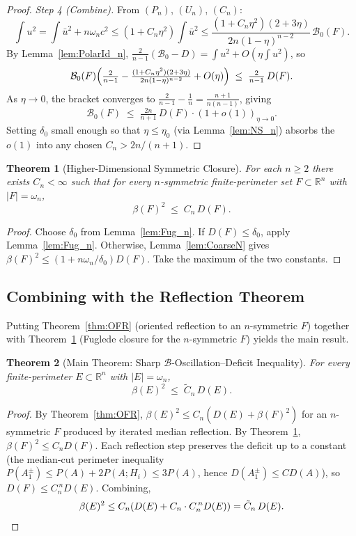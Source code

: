 \documentclass[11pt]{article}
\newtheorem{theorem}{Theorem}[section]
\newcommand{\R}{\mathbb{R}}
\newcommand{\B}{\mathcal{B}}
\begin{document}
\begin{proof}
\smallskip
\emph{Step 4 (Combine).} From $(P_n)$, $(U_n)$, $(C_n)$:
\[
   \int u^2 = \int\bar u^2 + n\omega_n c^2 \le (1 + C_n\eta^2)\!\int\bar u^2 \le \frac{(1 + C_n\eta^2)(2+3\eta)}{2n(1-\eta)^{n-2}}\,\B_0(F).
\]
By Lemma~\ref{lem:PolarId_n}, $\tfrac{2}{n-1}(\B_0 - D) = \int u^2 + O(\eta\int u^2)$, so
\[
   \B_0(F)\Bigl(\tfrac{2}{n-1} - \tfrac{(1 + C_n\eta^2)(2+3\eta)}{2n(1-\eta)^{n-2}} + O(\eta)\Bigr) \;\le\; \tfrac{2}{n-1}\,D(F).
\]
As $\eta\to 0$, the bracket converges to $\tfrac{2}{n-1} - \tfrac{1}{n} = \tfrac{n+1}{n(n-1)}$, giving
\[
   \B_0(F) \;\le\; \tfrac{2n}{n+1}\,D(F) \cdot (1 + o(1))_{\eta\to 0}.
\]
Setting $\delta_0$ small enough so that $\eta\le\eta_0$ (via Lemma~\ref{lem:NS_n}) absorbs the $o(1)$ into any chosen $C_n > 2n/(n+1)$.
\end{proof}

\begin{theorem}[Higher-Dimensional Symmetric Closure] \label{thm:HighDim}
For each $n\ge 2$ there exists $C_n<\infty$ such that for every $n$-symmetric finite-perimeter set $F\subset\R^n$ with $|F|=\omega_n$,
\[ \beta(F)^2 \;\le\; C_n\,D(F). \]
\end{theorem}
\begin{proof}
Choose $\delta_0$ from Lemma~\ref{lem:Fug_n}. If $D(F)\le\delta_0$, apply Lemma~\ref{lem:Fug_n}. Otherwise, Lemma~\ref{lem:CoarseN} gives $\beta(F)^2 \le (1+n\omega_n/\delta_0)D(F)$. Take the maximum of the two constants.
\end{proof}

\subsection{Combining with the Reflection Theorem}

Putting Theorem~\ref{thm:OFR} (oriented reflection to an $n$-symmetric $F$) together with Theorem~\ref{thm:HighDim} (Fuglede closure for the $n$-symmetric $F$) yields the main result.

\begin{theorem}[Main Theorem: Sharp $\B$-Oscillation--Deficit Inequality] \label{thm:Main}
For every finite-perimeter $E\subset\R^n$ with $|E|=\omega_n$,
\[ \beta(E)^2 \;\le\; \tilde C_n\,D(E). \]
\end{theorem}
\begin{proof}
By Theorem~\ref{thm:OFR}, $\beta(E)^2 \le C_n(D(E) + \beta(F)^2)$ for an $n$-symmetric $F$ produced by iterated median reflection. By Theorem~\ref{thm:HighDim}, $\beta(F)^2 \le C_n D(F)$. Each reflection step preserves the deficit up to a constant (the median-cut perimeter inequality $P(A_1^\pm) \le P(A) + 2P(A;H_i) \le 3P(A)$, hence $D(A_1^\pm) \le C D(A)$), so $D(F) \le C_n^{\,n} D(E)$. Combining,
\[ \beta(E)^2 \le C_n(D(E) + C_n \cdot C_n^{\,n} D(E)) = \tilde C_n\,D(E). \qedhere\]
\end{proof}
\end{document}
